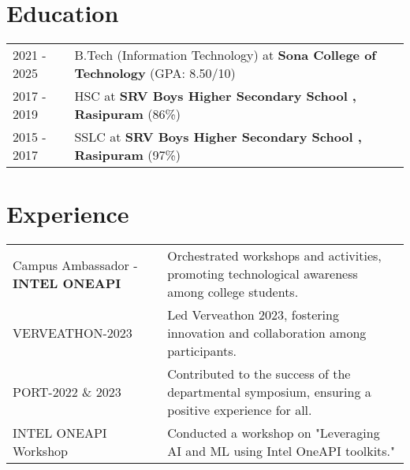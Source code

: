 \documentclass[a4paper,12pt]{article}
\begin{document}
\section{Education}
\begin{tabularx}{\linewidth}{@{}l X@{}}	
2021 - 2025 & B.Tech (Information Technology) at \textbf{Sona College of Technology} \hfill \normalsize (GPA: 8.50/10) \\


2017 - 2019 & HSC at \textbf{SRV Boys Higher Secondary School , Rasipuram} \hfill  (86\%) \\

2015 - 2017 & SSLC at \textbf{SRV Boys Higher Secondary School , Rasipuram} \hfill  (97\%) \\
\end{tabularx}





\section{Experience}
\begin{tabularx}{\linewidth}{@{}l X@{}}
Campus Ambassador - \textbf{INTEL ONEAPI} &  \normalsize{Orchestrated workshops and activities, promoting technological awareness among college students.}\\
VERVEATHON-2023 &  \normalsize{Led Verveathon 2023, fostering innovation and collaboration among participants.}\\
PORT-2022 \& 2023 &  \normalsize{Contributed to the success of the departmental symposium, ensuring a positive experience for all.}\\
INTEL ONEAPI Workshop & \normalsize{Conducted a workshop on "Leveraging AI and ML using Intel OneAPI toolkits."}\\
\end{tabularx}



\vfill
{}
\end{document}
